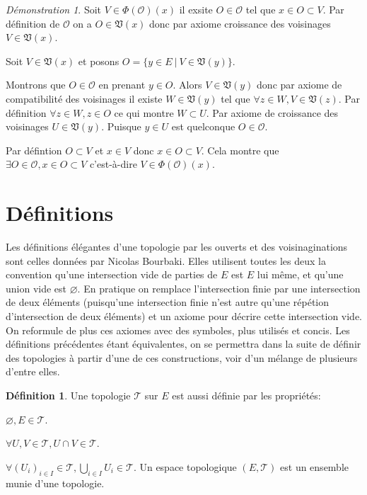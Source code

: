 \documentclass[a4paper, 11pt, french]{book}
\newenvironment{itemise}{\itemize}{\enditemize}
\theoremstyle{plain} %
\theoremstyle{definition} %
\newtheorem{definition}{Définition}
\theoremstyle{remark} %
\newtheorem*{demonstration}{Démonstration}
\newcommand{\1}{\mathds{1}}
\newcommand\vide{\varnothing}
\renewcommand{\frak}[1]{\mathfrak{#1}}
\newcommand{\scr}[1]{\mathscr{#1}}
\newcommand\ens[2]{\{#1 \ |\ #2\}}
\begin{document}
\begin{demonstration}
\begin{itemise}
\begin{itemise}
\begin{itemise}
				\item Soit $V\in\Phi(\scr{O})(x)$ il exsite $O\in\scr{O}$ tel que $x\in O\subset V$.
				Par définition de $\scr{O}$ on a $O\in\frak{V}(x)$ donc par axiome croissance des voisinages $V\in\frak{V}(x)$.
				\item Soit $V\in\frak{V}(x)$ et posons $O=\ens{y\in E}{V\in\frak{V}(y)}$.
				\begin{itemise}
					\item Montrons que $O\in\scr{O}$ en prenant $y\in O$.
					Alors $V\in\frak{V}(y)$ donc par axiome de compatibilité des voisinages il existe $W\in\frak{V}(y)$ tel que $\forall z\in W, V\in\frak{V}(z)$.
					Par définition $\forall z\in W, z\in O$ ce qui montre $W\subset U$.
					Par axiome de croissance des voisinages $U\in\frak{V}(y)$.
					Puisque $y\in U$ est quelconque $O\in\scr{O}$.
					\item Par défintion $O\subset V$ et $x\in V$ donc $x\in O\subset V$.
				\end{itemise}
				Cela montre que $\exists O\in\scr{O}, x\in O\subset V$ c'est-à-dire $V\in\Phi(\scr{O})(x)$.
			\end{itemise}
		\end{itemise}
	\end{itemise}
\end{demonstration}

\section{Définitions}

Les définitions élégantes d'une topologie par les ouverts et des voisinaginations sont celles données par Nicolas Bourbaki.
Elles utilisent toutes les deux la convention qu'une intersection vide de parties de $E$ est $E$ lui même, et qu'une union vide est $\vide$.
En pratique on remplace l'intersection finie par une intersection de deux éléments (puisqu'une intersection finie n'est autre qu'une répétion d'intersection de deux éléments) et un axiome pour décrire cette intersection vide.
On reformule de plus ces axiomes avec des symboles, plus utilisés et concis.
Les définitions précédentes étant équivalentes, on se permettra dans la suite de définir des topologies à partir d'une de ces constructions, voir d'un mélange de plusieurs d'entre elles.

\begin{definition}
	Une topologie $\scr{T}$ sur $E$ est aussi définie par les propriétés:
	\begin{itemise}
		\item $\vide, E\in\scr{T}$.
		\item $\forall U, V\in\scr{T}, U\cap V\in\scr{T}$.
		\item $\forall (U_i)_{i\in I}\in\scr{T}, \bigcup_{i\in I}U_i\in\scr{T}$.
	\end{itemise}
	Un espace topologique $(E, \scr{T})$ est un ensemble munie d'une topologie.
\end{definition}
\end{document}
